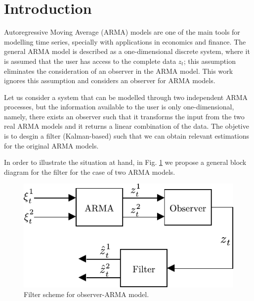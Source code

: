 \section{Introduction}\label{sec:intro}
Autoregressive Moving Average (ARMA) models are one of the main tools for modelling time series, specially with applications in economics and finance. The general ARMA model is described as a one-dimensional discrete system, where it is assumed that the user has access to the complete data $z_t$; this assumption eliminates the consideration of an observer in the ARMA model. This work ignores this assumption and considers an observer for ARMA models.


Let us consider a system that can be modelled through two independent ARMA processes, but the information available to the user is only one-dimensional, namely, there exists an observer such that it transforms the input from the two real ARMA models and it returns a linear combination of the data. The objetive is to desgin a filter (Kalman-based) such that we can obtain relevant estimations for the original ARMA models.

In order to illustrate the situation at hand, in Fig. \ref{fig:filter_scheme} we propose a general block diagram for the filter for the case of two ARMA models.


\begin{figure}[H]
  \centering
  \includegraphics[scale=0.8]{files/arma_vadim.pdf}
  \caption{Filter scheme for observer-ARMA model.}
  \label{fig:filter_scheme}
\end{figure}
